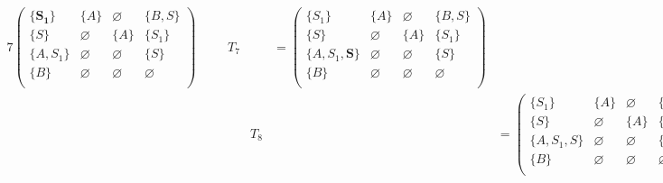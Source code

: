 \begin{example}
\begin{alignat*}{7}
\begin{pmatrix}
\{\pmb{S_1}\}     & \{A\}       & \varnothing & \{B, S\}    \\
\{S\}       & \varnothing & \{A\}       & \{S_1\}     \\
\{A, S_1\}  & \varnothing & \varnothing & \{S\}       \\
\{B\}       & \varnothing & \varnothing & \varnothing \\
\end{pmatrix} \ \ \ \ &&T_7 &&= \begin{pmatrix}
\{S_1\}     & \{A\}       & \varnothing & \{B, S\}    \\
\{S\}       & \varnothing & \{A\}       & \{S_1\}     \\
\{A, S_1, \pmb{S}\}  & \varnothing & \varnothing & \{S\}    \\
\{B\}       & \varnothing & \varnothing & \varnothing \\
\end{pmatrix}  \\
& &&T_8 &&= \begin{pmatrix}
\{S_1\}     & \{A\}       & \varnothing & \{B, S\}    \\
\{S\}       & \varnothing & \{A\}       & \{S_1\}     \\
\{A, S_1, S\}  & \varnothing & \varnothing & \{S, \pmb{S_1}\} \\
\{B\}       & \varnothing & \varnothing & \varnothing \\
\end{pmatrix} \ \ \ \ &&T_9 &&= \begin{pmatrix}
\{S_1\}     & \{A\}       & \varnothing & \{B, S\}    \\
\{S\}       & \varnothing & \{A\}       & \{S_1, \pmb{S}\}     \\
\{A, S_1, S\}  & \varnothing & \varnothing & \{S, S_1\} \\
\{B\}       & \varnothing & \varnothing & \varnothing \\
\end{pmatrix} \ \ \ \ &&T_{10} &&= \begin{pmatrix}
\{S_1\}     & \{A\}       & \varnothing & \{B, S\}    \\
\{S, \pmb{S_1}\}       & \varnothing & \{A\}       & \{S_1, S\}     \\
\{A, S_1, S\}  & \varnothing & \varnothing & \{S, S_1\} \\
\{B\}       & \varnothing & \varnothing & \varnothing \\
\end{pmatrix}  \\

\end{alignat*}
\end{example}
